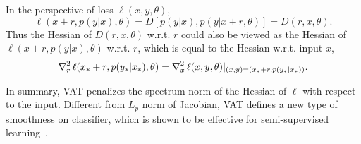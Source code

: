 \documentclass{article}
\begin{document}
In the perspective of loss $\ell(x,y,\theta)$,
\begin{equation*}
    \ell(x+r,p(y|x),\theta)=D\left[p(y|x),p(y|x+r,\theta)\right] = D(r,x,\theta).
\end{equation*}
Thus the Hessian of $D(r,x,\theta)$ w.r.t. $r$ could also be viewed as the Hessian of $\ell(x+r, p(y|x), \theta)$ w.r.t. $r$, which is equal to the Hessian w.r.t. input $x$,
\begin{equation*}
    \operatorname{\nabla}^2_r \ell(x_*+r, p(y_*|x_*), \theta) = \operatorname{\nabla}^2_x \ell(x,y,\theta)|_{(x,y)=(x_*+r, p(y_*|x_*))}.
\end{equation*}

In summary, VAT penalizes the spectrum norm of the Hessian of $\ell$ with respect to the input.
Different from $L_p$ norm of Jacobian, VAT defines a new type of smoothness on classifier, which is shown to be effective for semi-supervised learning~\cite{miyato2017virtual}.




\end{document}

